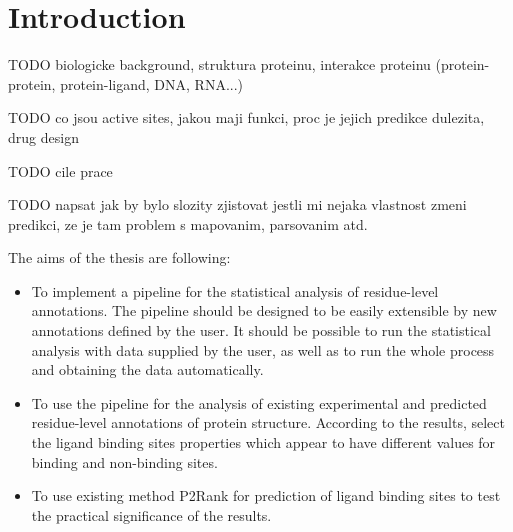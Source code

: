 
\chapter{Introduction}

TODO biologicke background, struktura proteinu, interakce proteinu (protein-protein, protein-ligand, DNA, RNA...)

TODO co jsou active sites, jakou maji funkci, proc je jejich predikce dulezita, drug design



TODO cile prace

TODO napsat jak by bylo slozity zjistovat jestli mi nejaka vlastnost zmeni predikci, ze je tam problem s mapovanim, parsovanim atd.

The aims of the thesis are following:

\begin{itemize}
\item To implement a pipeline for the statistical analysis of residue-level annotations. The pipeline should be designed to be easily extensible by new annotations defined by the user. It should be possible to run the statistical analysis with data supplied by the user, as well as to run the whole process and obtaining the data automatically.
\item To use the pipeline for the analysis of existing experimental and predicted residue-level annotations of protein structure. According to the results, select the ligand binding sites properties which appear to have different values for binding and non-binding sites.
\item To use existing method P2Rank \cite{p2rank1} for prediction of ligand binding sites to test the practical significance of the results.

\end{itemize}
